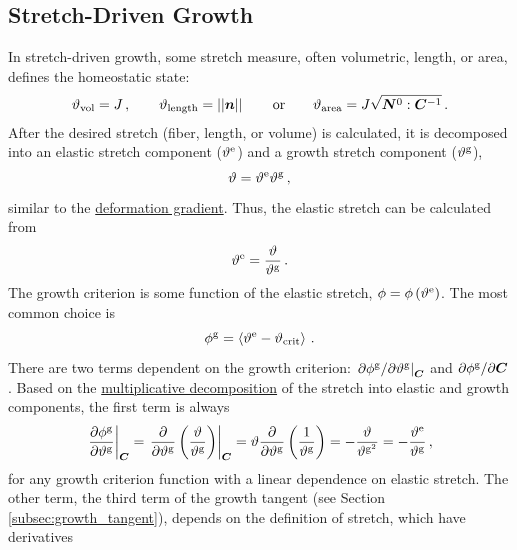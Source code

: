 \documentclass[10pt,letterpaper,oneside]{report}
\newcommand{\ten}[1]{\mbox{\boldmath $#1$}{}}
\newcommand{\scas}[1]{\mbox{{\scriptsize{${\rm{#1}}$}}}{}}
\newcommand{\tens}[1]{\mbox{\boldmath{\scriptsize{$#1$}}}{}}
\begin{document}
\subsection{Stretch-Driven Growth}
In stretch-driven growth, some stretch measure, often volumetric, length, or area, defines the homeostatic state:
\begin{align}
\vartheta_{\scas{vol}} = J \, , 
\qquad 
\vartheta_{\scas{length}} = || \ten{n} || \,    
\qquad \mbox{or} \qquad
\vartheta_{\scas{area}} = J \sqrt{ \ten{N}^0 : \ten{C}^{-1} } \, .
\label{stretches}
\end{align}
After the desired stretch (fiber, length, or volume) is calculated, it is decomposed into an elastic stretch component ($\vartheta^{\scas{e}}$) and a growth stretch component ($\vartheta^{\scas{g}}$), 
\begin{equation}
\vartheta = \vartheta^{\scas{e}} \vartheta^{\scas{g}} \, , 
\end{equation}
similar to the \hyperlink{multiplicative}{deformation gradient}. 
Thus, the elastic stretch can be calculated from
\begin{equation}
\vartheta^{\scas{e}} = \frac{\vartheta}{\vartheta^{\scas{g}}} \, . 
\end{equation}
The growth criterion is some function of the elastic stretch, $\phi =  \phi \left( \vartheta^{\scas{e}} \right)$. The most common choice is
\begin{equation}
\phi^{\scas{g}} = \left\langle \vartheta^{\scas{e}} - \vartheta_{\scas{crit}} \right\rangle \, . 
\label{growth_criterion}
\end{equation}
There are two terms dependent on the growth criterion: $ \left. \partial \phi^{\scas{g}} / \partial \vartheta^{\scas{g}} \right|_{\tens{C}} $ and $ \partial \phi^{\scas{g}} / \partial \ten{C} $.  Based on the \hyperlink{multiplicative}{multiplicative decomposition} of the stretch into elastic and growth components, the first term is always 
\begin{equation}
\left. \frac{\partial \phi^{\scas{g}}}{\partial \vartheta^{\scas{g}}} \right|_{\tens{C}} = \left. \frac{\partial }{\partial \vartheta^{\scas{g}}} \left( \frac{\vartheta}{ \vartheta^{\scas{g}}} \right) \right|_{\tens{C}} = \vartheta \frac{\partial }{\partial \vartheta^{\scas{g}}} \left( \frac{1}{ \vartheta^{\scas{g}}} \right) = - \frac{\vartheta }{ \vartheta^{\scas{g}^2}} = - \frac{\vartheta^{\scas{e}} }{ \vartheta^{\scas{g}}} \, , 
\label{growth_criterion_deriv}
\end{equation}
for any growth criterion function with a linear dependence on elastic stretch.  The other term, the third term of the growth tangent (see Section \ref{subsec:growth_tangent}), depends on the definition of stretch, which have derivatives
\end{document}
